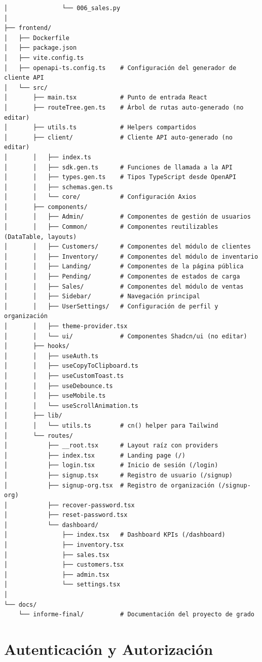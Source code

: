\begin{verbatim}
│               └── 006_sales.py
│
├── frontend/
│   ├── Dockerfile
│   ├── package.json
│   ├── vite.config.ts
│   ├── openapi-ts.config.ts    # Configuración del generador de cliente API
│   └── src/
│       ├── main.tsx            # Punto de entrada React
│       ├── routeTree.gen.ts    # Árbol de rutas auto-generado (no editar)
│       ├── utils.ts            # Helpers compartidos
│       ├── client/             # Cliente API auto-generado (no editar)
│       │   ├── index.ts
│       │   ├── sdk.gen.ts      # Funciones de llamada a la API
│       │   ├── types.gen.ts    # Tipos TypeScript desde OpenAPI
│       │   ├── schemas.gen.ts
│       │   └── core/           # Configuración Axios
│       ├── components/
│       │   ├── Admin/          # Componentes de gestión de usuarios
│       │   ├── Common/         # Componentes reutilizables (DataTable, layouts)
│       │   ├── Customers/      # Componentes del módulo de clientes
│       │   ├── Inventory/      # Componentes del módulo de inventario
│       │   ├── Landing/        # Componentes de la página pública
│       │   ├── Pending/        # Componentes de estados de carga
│       │   ├── Sales/          # Componentes del módulo de ventas
│       │   ├── Sidebar/        # Navegación principal
│       │   ├── UserSettings/   # Configuración de perfil y organización
│       │   ├── theme-provider.tsx
│       │   └── ui/             # Componentes Shadcn/ui (no editar)
│       ├── hooks/
│       │   ├── useAuth.ts
│       │   ├── useCopyToClipboard.ts
│       │   ├── useCustomToast.ts
│       │   ├── useDebounce.ts
│       │   ├── useMobile.ts
│       │   └── useScrollAnimation.ts
│       ├── lib/
│       │   └── utils.ts        # cn() helper para Tailwind
│       └── routes/
│           ├── __root.tsx      # Layout raíz con providers
│           ├── index.tsx       # Landing page (/)
│           ├── login.tsx       # Inicio de sesión (/login)
│           ├── signup.tsx      # Registro de usuario (/signup)
│           ├── signup-org.tsx  # Registro de organización (/signup-org)
│           ├── recover-password.tsx
│           ├── reset-password.tsx
│           └── dashboard/
│               ├── index.tsx   # Dashboard KPIs (/dashboard)
│               ├── inventory.tsx
│               ├── sales.tsx
│               ├── customers.tsx
│               ├── admin.tsx
│               └── settings.tsx
│
└── docs/
    └── informe-final/          # Documentación del proyecto de grado
\end{verbatim}

\section{Autenticación y Autorización}\label{autenticaciuxf3n-y-autorizaciuxf3n}


